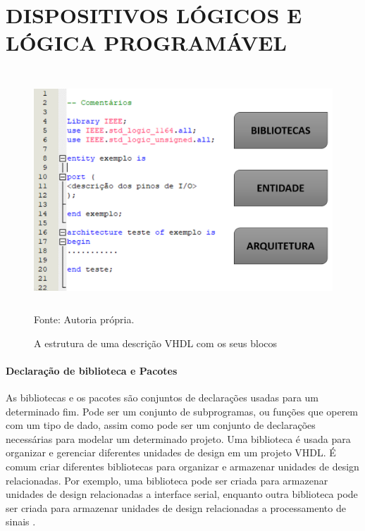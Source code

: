 \chapter{DISPOSITIVOS LÓGICOS E LÓGICA PROGRAMÁVEL}
\label{cap2}


\begin{figure}[!htb]
    \centering
    \caption{A estrutura de uma descrição VHDL com os seus blocos}
    \includegraphics[height = 9cm]{figuras/estrut_blocVHDL.png}\\
    {\footnotesize Fonte: Autoria própria.}
    \label{fig:vhdl_blocos_estrut}
\end{figure}
 
\subsubsection{Declaração de biblioteca e Pacotes}

As bibliotecas e os pacotes são conjuntos de declarações usadas para um determinado fim. Pode ser um conjunto de subprogramas, ou funções que operem com um tipo de dado, assim como pode ser um conjunto de declarações necessárias para modelar um determinado projeto. Uma biblioteca é usada para organizar e gerenciar diferentes unidades de design em um projeto VHDL. É comum criar diferentes bibliotecas para organizar e armazenar unidades de design relacionadas. Por exemplo, uma biblioteca pode ser criada para armazenar unidades de design relacionadas a interface serial, enquanto outra biblioteca pode ser criada para armazenar unidades de design relacionadas a processamento de sinais \cite{roth2004circuit}.

